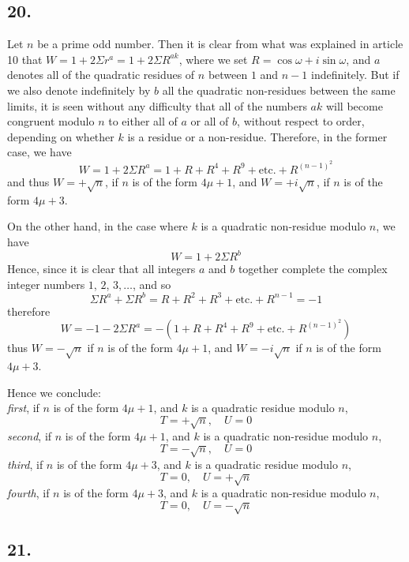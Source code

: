 \documentclass[twoside,12pt]{memoir}
\begin{document}
\subsection*{20.}
 
Let \(n\) be a prime odd number.  Then it is clear from what was explained in article 10 that \(W=1+2 \Sigma r^{a}=1+2 \Sigma R^{a k}\), where we set \(R=\cos \omega+i \sin \omega\), and \(a\) denotes all of the quadratic residues of \(n\) between \(1\) and \(n-1\) indefinitely. But if we also denote indefinitely by \(b\) all the quadratic non-residues between the same limits, it is seen without any difficulty that all of the numbers \(a k\) will become congruent modulo \(n\) to either all of \(a\) or all of \(b\), without respect to order, depending on whether \(k\) is a residue or a non-residue. Therefore, in the former case, we have\pagebreak%
\[W=1+2 \Sigma R^{a}=1+R+R^{4}+R^{9}+\text{etc{.}}+R^{(n-1)^{2}}\]
and thus \(W=+\sqrt{n}\), if \(n\) is of the form \(4 \mu+1\), and \(W=+i \sqrt{n}\), if \(n\) is of the form \(4 \mu+3\).

On the other hand, in the case where \(k\) is a quadratic non-residue modulo \(n\), we have
\[W=1+2 \Sigma R^{b}\]
Hence, since it is clear that all integers \(a\) and \(b\) together complete the complex integer numbers \(1\), \(2\), \(3, \ldots\), and so
\[\Sigma R^{a}+\Sigma R^{b}=R+R^{2}+R^{3}+\text{etc{.}}+R^{n-1}=-1\]
therefore
\[W=-1-2 \Sigma R^{a}=-(1+R+R^{4}+R^{9}+\text{etc{.}}+R^{(n-1)^{2}})\]
thus \(W=-\sqrt{n}\) if \(n\) is of the form \(4\mu+1\), and \(W=-i\sqrt{n}\) if \(n\) is of the form \(4\mu+3\).

Hence we conclude:\\
\textit{first}, if \(n\) is of the form \(4\mu+1\), and \(k\) is a quadratic residue modulo \(n\),
\[T=+\sqrt{n}, \quad U=0\]
\textit{second}, if \(n\) is of the form \(4\mu+1\), and \(k\) is a quadratic non-residue modulo \(n\),
\[T=-\sqrt{n}, \quad U=0\]
\textit{third}, if \(n\) is of the form \(4\mu+3\), and \(k\) is a quadratic residue modulo \(n\),
\[T=0, \quad U=+\sqrt{n}\]
\textit{fourth}, if \(n\) is of the form \(4\mu+3\), and \(k\) is a quadratic non-residue modulo \(n\),
\[T=0, \quad U=-\sqrt{n}\]

\subsection*{21.}
\end{document}
